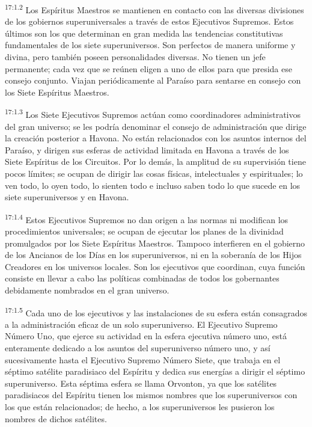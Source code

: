 \par
\textsuperscript{17:1.2} Los Espíritus Maestros se mantienen en contacto con las diversas divisiones de los gobiernos superuniversales a través de estos Ejecutivos Supremos. Estos últimos son los que determinan en gran medida las tendencias constitutivas fundamentales de los siete superuniversos. Son perfectos de manera uniforme y divina, pero también poseen personalidades diversas. No tienen un jefe permanente; cada vez que se reúnen eligen a uno de ellos para que presida ese consejo conjunto. Viajan periódicamente al Paraíso para sentarse en consejo con los Siete Espíritus Maestros.

\par
\textsuperscript{17:1.3} Los Siete Ejecutivos Supremos actúan como coordinadores administrativos del gran universo; se les podría denominar el consejo de administración que dirige la creación posterior a Havona. No están relacionados con los asuntos internos del Paraíso, y dirigen sus esferas de actividad limitada en Havona a través de los Siete Espíritus de los Circuitos. Por lo demás, la amplitud de su supervisión tiene pocos límites; se ocupan de dirigir las cosas físicas, intelectuales y espirituales; lo ven todo, lo oyen todo, lo sienten todo e incluso saben todo lo que sucede en los siete superuniversos y en Havona.

\par
\textsuperscript{17:1.4} Estos Ejecutivos Supremos no dan origen a las normas ni modifican los procedimientos universales; se ocupan de ejecutar los planes de la divinidad promulgados por los Siete Espíritus Maestros. Tampoco interfieren en el gobierno de los Ancianos de los Días en los superuniversos, ni en la soberanía de los Hijos Creadores en los universos locales. Son los ejecutivos que coordinan, cuya función consiste en llevar a cabo las políticas combinadas de todos los gobernantes debidamente nombrados en el gran universo.

\par
\textsuperscript{17:1.5} Cada uno de los ejecutivos y las instalaciones de su esfera están consagrados a la administración eficaz de un solo superuniverso. El Ejecutivo Supremo Número Uno, que ejerce su actividad en la esfera ejecutiva número uno, está enteramente dedicado a los asuntos del superuniverso número uno, y así sucesivamente hasta el Ejecutivo Supremo Número Siete, que trabaja en el séptimo satélite paradisiaco del Espíritu y dedica sus energías a dirigir el séptimo superuniverso. Esta séptima esfera se llama Orvonton, ya que los satélites paradisiacos del Espíritu tienen los mismos nombres que los superuniversos con los que están relacionados; de hecho, a los superuniversos les pusieron los nombres de dichos satélites.

